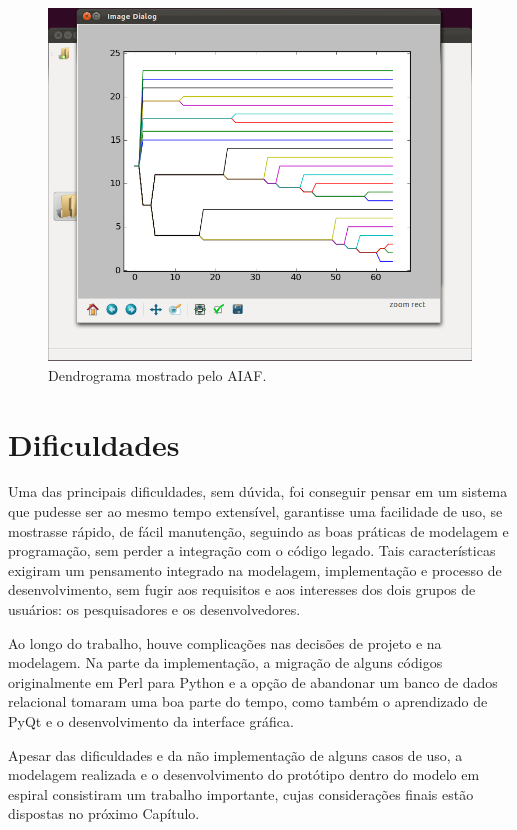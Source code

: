 \begin{figure}
\centering
\includegraphics[scale=0.38]{navi-dendrogram}
\caption{Dendrograma mostrado pelo AIAF.}
\label{fig:navi-dendrogram}
\end{figure}

\section{Dificuldades} \label{sec:dificuldades}

Uma das principais dificuldades, sem dúvida, foi conseguir pensar em um sistema que pudesse ser ao mesmo tempo extensível, garantisse uma facilidade de uso,
se mostrasse rápido, de fácil manutenção, seguindo as boas práticas de modelagem e programação, sem perder a integração com o código legado. Tais
características exigiram um pensamento integrado na modelagem, implementação e processo de desenvolvimento, sem fugir aos requisitos e aos interesses dos dois
grupos de usuários: os pesquisadores e os desenvolvedores.

Ao longo do trabalho, houve complicações nas decisões de projeto e na modelagem. Na parte da implementação, a migração de alguns códigos originalmente em Perl
para Python e a opção de abandonar um banco de dados relacional tomaram uma boa parte do tempo, como também o aprendizado de PyQt e o desenvolvimento da
interface gráfica.

Apesar das dificuldades e da não implementação de alguns casos de uso, a modelagem realizada e o desenvolvimento do protótipo dentro do modelo em espiral
consistiram um trabalho importante, cujas considerações finais estão dispostas no próximo Capítulo.
